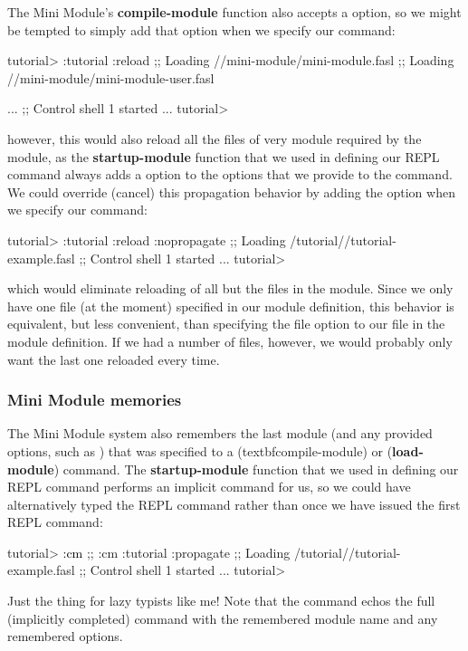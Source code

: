 \documentclass[10pt,twoside,english,pdftex]{article}
\begin{document}
The Mini Module's \textbf{compile-module} function also accepts a
 option, so we might be tempted to simply add that option when
we specify our  command:
%
\W\supp
\begin{example}
\textcolor{darkergray}{%
  tutorial> :tutorial :reload
  ;;   Loading //mini-module/mini-module.fasl
  ;;     Loading //mini-module/mini-module-user.fasl

     ...
  ;; Control shell 1 started
     ...
  tutorial>}
\end{example}
%
however, this would also reload all the files of very module required by the
 module, as the \textbf{startup-module} function that we used
in defining our  REPL command always adds a 
option to the options that we provide to the command.  We could override
(cancel) this propagation behavior by adding the  option
when we specify our  command:
%
\W\supp\notpretop
\begin{example}
\textcolor{darkergray}{%
  tutorial> :tutorial :reload :nopropagate
  ;; Loading /tutorial//tutorial-example.fasl
  ;; Control shell 1 started
     ...
  tutorial>}
\end{example}
%
which would eliminate reloading of all but the files in the 
module.  Since we only have one file (at the moment) specified in our
 module definition, this behavior is equivalent, but less
convenient, than specifying the  file option to our
 file in the module definition.  If we had a number of
files, however, we would probably only want the last one reloaded every time.

\subsubsection*{Mini Module memories}

The Mini Module system also remembers the last module (and any provided
options, such as ) that was specified to a 
(textbf{compile-module}) or  (\textbf{load-module}) command.  The
\textbf{startup-module} function that we used in defining our 
REPL command performs an implicit  command for us, so we could have
alternatively typed the  REPL command rather than 
once we have issued the first  REPL command:
%
\W\supp
\begin{example}
\textcolor{darkergray}{%
  tutorial> \textcolor{black}{:cm}
  ;; :cm :tutorial :propagate
  ;; Loading /tutorial//tutorial-example.fasl
  ;; Control shell 1 started
     ...
  tutorial>}
\end{example}
%
Just the thing for lazy typists like me!  Note that the  command
echos the full (implicitly completed) command with the remembered module name
and any remembered options.
\end{document}
